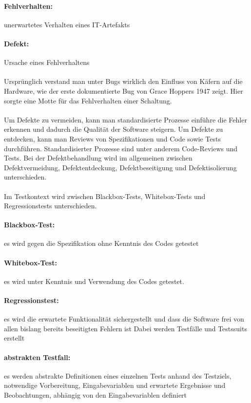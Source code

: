\paragraph{Fehlverhalten:} unerwartetes Verhalten eines IT-Artefakts
\paragraph{Defekt:} Ursache eines Fehlverhaltens
\\\\
Ursprünglich verstand man unter Bugs wirklich den Einfluss von Käfern auf die Hardware, wie der erste dokumentierte Bug von Grace Hoppers 1947 zeigt. Hier sorgte eine Motte für das Fehlverhalten einer Schaltung.
\\\\
Um Defekte zu vermeiden, kann man standardisierte Prozesse einführe die Fehler erkennen und dadurch die Qualität der Software steigern. Um Defekte zu entdecken, kann man Reviews von Spezifikationen und Code sowie Tests durchführen.
Standardisierter Prozesse sind unter anderem Code-Reviews und Tests. Bei der Defektbehandlung wird im allgemeinen zwischen Defektvermeidung, Defektentdeckung, Defektbeseitigung und Defektisolierung unterschieden.
\\\\
Im Testkontext wird zwischen Blackbox-Tests, Whitebox-Tests und Regressionstests unterschieden. 

\paragraph{Blackbox-Test:} es wird gegen die Spezifikation ohne Kenntnis des Codes getestet
\paragraph{Whitebox-Test:} es wird unter Kenntnis und Verwendung des Codes getestet.
\paragraph{Regressionstest:} es wird die erwartete Funktionalität sichergestellt und dass die Software frei von allen bislang bereits beseitigten Fehlern ist
\linebreak
Dabei werden Testfälle und Testssuits erstellt
\paragraph{abstrakten Testfall:} es werden abstrakte Definitionen eines einzelnen Tests anhand des Testziels, notwendige Vorbereitung, Eingabevariablen und erwartete Ergebnisse und Beobachtungen, abhängig von den Eingabevariablen definiert
